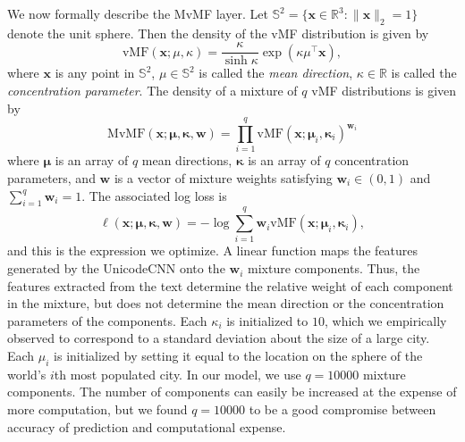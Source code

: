 \documentclass[sigconf,anonymous,review]{acmart}
\newcommand{\defn}[1]{\textit{#1}}
\newcommand{\trans}[1]{{#1}^{\top}}
\newcommand{\ltwo}[1]{\lVert {#1} \rVert_2}
\newcommand{\w}{\mathbf{w}}
\newcommand{\x}{\mathbf{x}}
\newcommand{\fixme}[1]{\textcolor{red}{\textbf{FIXME:} {#1}}}
\begin{document}
\begin{description}
        We now formally describe the MvMF layer.
        Let $\mathbb{S}^2 = \{ \x \in \mathbb R^3 : \ltwo{\x}=1 \}$ denote the unit sphere.
        Then the density of the vMF distribution is given by
        \begin{equation}
            \text{vMF}(\x;\mu,\kappa) = \frac{\kappa}{\sinh \kappa} \exp(\kappa\trans\mu\x),
        \end{equation}
        where 
        $\x$ is any point in $\mathbb{S}^2$,
        $\mu\in\mathbb{S}^2$ is called the \defn{mean direction},
        $\kappa\in\mathbb R$ is called the \defn{concentration parameter}.
        The density of a mixture of $q$ vMF distributions is given by
        \begin{equation}
            \text{MvMF}(\x;\boldsymbol{\mu},\boldsymbol{\kappa},\w) = \prod_{i=1}^q \text{vMF}(\x;\boldsymbol\mu_i,\boldsymbol\kappa_i)^{\w_i}
        \end{equation}
        where 
        $\boldsymbol\mu$ is an array of $q$ mean directions,
        $\boldsymbol\kappa$ is an array of $q$ concentration parameters,
        and $\w$ is a vector of mixture weights satisfying
        $\w_i\in(0,1)$ and $\sum_{i=1}^q \w_i = 1$.
        The associated log loss is 
        \begin{equation}
            \ell(\x;\boldsymbol\mu,\boldsymbol\kappa,\w) = -\log\sum_{i=1}^q {\w}_i \text{vMF}(\x;\boldsymbol\mu_i,\boldsymbol\kappa_i),
        \end{equation}
        and this is the expression we optimize.
        A linear function maps the features generated by the UnicodeCNN onto the $\w_i$ mixture components.
        Thus, the features extracted from the text determine the relative weight of each component in the mixture,
        but does not determine the mean direction or the concentration parameters of the components.
        Each $\kappa_i$ is initialized to $10$,
        which we empirically observed to correspond to a standard deviation about the size of a large city.
        Each $\mu_i$ is initialized by setting it equal to the location on the sphere of the world's $i$th most populated city.
        In our model, we use $q=10000$ mixture components. 
        The number of components can easily be increased at the expense of more computation,
        but we found $q=10000$ to be a good compromise between accuracy of prediction and computational expense.


\end{description}
\end{document}
